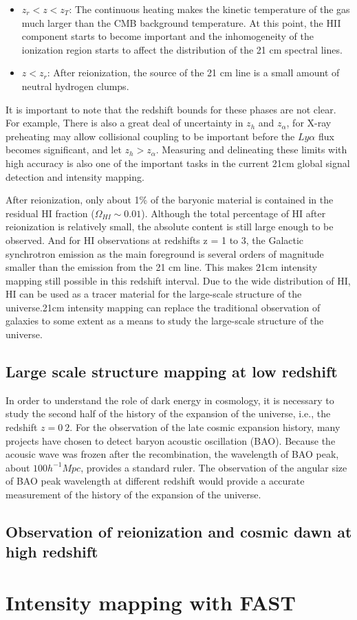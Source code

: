 \documentclass{article}
\begin{document}
\begin{itemize}
    \item $z_r<z<z_T$: The continuous heating makes the kinetic temperature of the gas much larger than the CMB background temperature. At this point, the HII component starts to become important and the inhomogeneity of the ionization region starts to affect the distribution of the 21 cm spectral lines.
    \item $z<z_r$: After reionization, the source of the 21 cm line is a small amount of neutral hydrogen clumps.
\end{itemize}
It is important to note that the redshift bounds for these phases are not clear. For example, There is also a great deal of uncertainty in $z_h$ and $z_\alpha$, for X-ray preheating may allow collisional coupling to be important before the $Ly\alpha$ flux becomes significant, and let $z_h>z_\alpha$. Measuring and delineating these limits with high accuracy is also one of the important tasks in the current 21cm global signal detection and intensity mapping.

After reionization, only about 1\% of the baryonic material is contained in the residual HI fraction ($\Omega_{HI}\sim 0.01$). Although the total percentage of HI after reionization is relatively small, the absolute content is still large enough to be observed. And for HI observations at redshifts z = 1 to 3, the Galactic synchrotron emission as the main foreground is several orders of magnitude smaller than the emission from the 21 cm line. This makes 21cm intensity mapping still possible in this redshift interval. Due to the wide distribution of HI, HI can be used as a tracer material for the large-scale structure of the universe.21cm intensity mapping can replace the traditional observation of galaxies to some extent as a means to study the large-scale structure of the universe.

\subsection{Large scale structure mapping at low redshift}
In order to understand the role of dark energy in cosmology, it is necessary to study the second half of the history of the expansion of the universe, i.e., the redshift $z=0~2$. For the observation of the late cosmic expansion history, many projects have chosen to detect baryon acoustic oscillation (BAO). Because the acousic wave was frozen after the recombination, the wavelength of BAO peak, about $100h^{-1}Mpc$, provides a standard ruler. The observation of the angular size of BAO peak wavelength at different redshift would provide a accurate measurement of the history of the expansion of the universe.



\subsection{Observation of reionization and cosmic dawn at high redshift}

\section{Intensity mapping with FAST}
\end{document}
